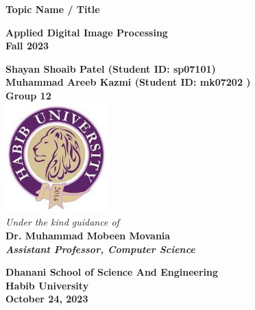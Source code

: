 \documentclass[12pt,a4paper,IEEEtran]{article}
\begin{document}
	\begin{center}
		\begin{LARGE}			\bf{Topic Name / Title\\}
		\end{LARGE}
		\vspace*{30pt}
		\textbf{Applied Digital Image Processing \\ Fall 2023}
		\vspace{40pt}
		
		\textbf{
			Shayan Shoaib Patel (Student ID: sp07101)\\
			Muhammad Areeb Kazmi (Student ID: mk07202 )\\
            Group 12}\\

		\vspace{30pt}
		\includegraphics[width=0.3\textwidth]{./logo.png} \\
		\vspace{30pt}
		\textit{Under the kind guidance of}\\
		\textbf{Dr. Muhammad Mobeen Movania}\\
		\textit{\textbf{Assistant Professor, Computer Science}}
		
		
		\vspace{20pt}
		
		
		\textbf{Dhanani School of Science And Engineering\\
			Habib University\\
			October 24, 2023
		}
	\end{center}





\setlength{\oddsidemargin}{0.25in}
\setlength{\textwidth}{6.5in}
\setlength{\topmargin}{0in}
\setlength{\textheight}{8.5in}
\end{document}
